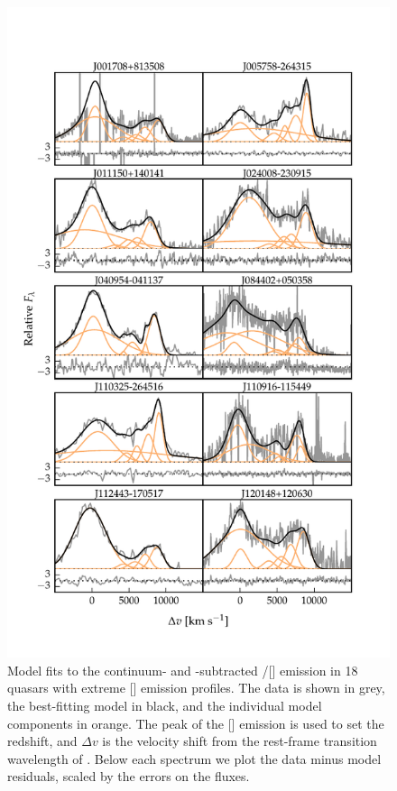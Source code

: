 \begin{figure}
    \centering
    \includegraphics[width=\columnwidth]{figures/chapter04/example_spectrum_grid_extreme_oiii_1.pdf} 
    \caption[{Model fits to the continuum- and -subtracted \hbns/[] emission in 18 quasars with extreme [] emission profiles.}]{Model fits to the continuum- and -subtracted \hbns/[] emission in 18 quasars with extreme [] emission profiles. The data is shown in grey, the best-fitting model in black, and the individual model components in orange. The peak of the [] emission is used to set the redshift, and $\Delta{v}$ is the velocity shift from the rest-frame transition wavelength of \hbns. Below each spectrum we plot the data minus model residuals, scaled by the errors on the fluxes.}     
    \label{fig:example_spectrum_grid_extreme_oiii_1}
\end{figure}

